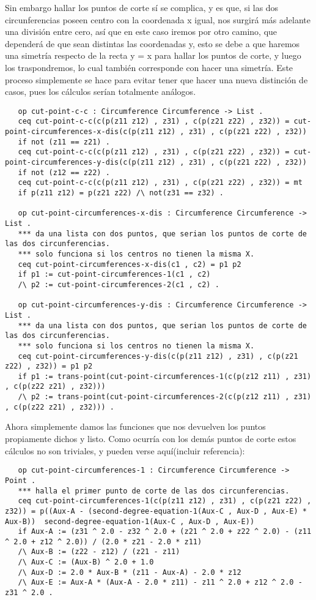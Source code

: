 {Sin embargo hallar los puntos de corte sí se complica, y es que, si las dos circunferencias poseen centro con la coordenada x igual, nos surgirá más adelante una división entre cero, así que en este caso iremos por otro camino, que dependerá de que sean distintas las coordenadas y, esto se debe a que haremos una simetría respecto de la recta y = x para hallar los puntos de corte, y luego los traspondremos, lo cual también corresponde con hacer una simetría. Este proceso simplemente se hace para evitar tener que hacer una nueva distinción de casos, pues los cálculos serían totalmente análogos. \par
{\codesize
\begin{verbatim}
   op cut-point-c-c : Circumference Circumference -> List .
   ceq cut-point-c-c(c(p(z11 z12) , z31) , c(p(z21 z22) , z32)) = cut-point-circumferences-x-dis(c(p(z11 z12) , z31) , c(p(z21 z22) , z32)) 
   if not (z11 == z21) .
   ceq cut-point-c-c(c(p(z11 z12) , z31) , c(p(z21 z22) , z32)) = cut-point-circumferences-y-dis(c(p(z11 z12) , z31) , c(p(z21 z22) , z32))
   if not (z12 == z22) .
   ceq cut-point-c-c(c(p(z11 z12) , z31) , c(p(z21 z22) , z32)) = mt 
   if p(z11 z12) = p(z21 z22) /\ not(z31 == z32) .

   op cut-point-circumferences-x-dis : Circumference Circumference -> List .
   *** da una lista con dos puntos, que serian los puntos de corte de las dos circunferencias.
   *** solo funciona si los centros no tienen la misma X.
   ceq cut-point-circumferences-x-dis(c1 , c2) = p1 p2
   if p1 := cut-point-circumferences-1(c1 , c2) 
   /\ p2 := cut-point-circumferences-2(c1 , c2) .

   op cut-point-circumferences-y-dis : Circumference Circumference -> List .
   *** da una lista con dos puntos, que serian los puntos de corte de las dos circunferencias.
   *** solo funciona si los centros no tienen la misma X.
   ceq cut-point-circumferences-y-dis(c(p(z11 z12) , z31) , c(p(z21 z22) , z32)) = p1 p2
   if p1 := trans-point(cut-point-circumferences-1(c(p(z12 z11) , z31) , c(p(z22 z21) , z32))) 
   /\ p2 := trans-point(cut-point-circumferences-2(c(p(z12 z11) , z31) , c(p(z22 z21) , z32))) .

\end{verbatim}
}

Ahora simplemente damos las funciones que nos devuelven los puntos propiamente dichos y listo. Como ocurría con los demás puntos de corte estos cálculos no son triviales, y pueden verse aquí(incluir referencia): 
{\codesize
\begin{verbatim}
   op cut-point-circumferences-1 : Circumference Circumference -> Point .
   *** halla el primer punto de corte de las dos circunferencias.
   ceq cut-point-circumferences-1(c(p(z11 z12) , z31) , c(p(z21 z22) , z32)) = p((Aux-A - (second-degree-equation-1(Aux-C , Aux-D , Aux-E) * Aux-B))  second-degree-equation-1(Aux-C , Aux-D , Aux-E))
   if Aux-A := (z31 ^ 2.0 - z32 ^ 2.0 + (z21 ^ 2.0 + z22 ^ 2.0) - (z11 ^ 2.0 + z12 ^ 2.0)) / (2.0 * z21 - 2.0 * z11) 
   /\ Aux-B := (z22 - z12) / (z21 - z11) 
   /\ Aux-C := (Aux-B) ^ 2.0 + 1.0
   /\ Aux-D := 2.0 * Aux-B * (z11 - Aux-A) - 2.0 * z12
   /\ Aux-E := Aux-A * (Aux-A - 2.0 * z11) - z11 ^ 2.0 + z12 ^ 2.0 - z31 ^ 2.0 .


\end{verbatim}}}
